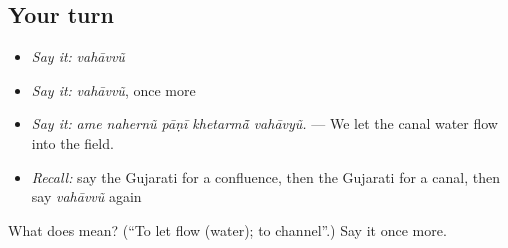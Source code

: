 \subsection*{Your turn}
\begin{itemize}
\raggedright
  \item \emph{Say it:} \emph{vahāvvũ}
  \item \emph{Say it:} \emph{vahāvvũ}, once more
  \item \emph{Say it:} \emph{ame nahernũ pāṇī khetarmā̃ vahāvyũ.} — We let the canal water flow into the field.
  \item \emph{Recall:} say the Gujarati for a confluence, then the Gujarati for a canal, then say \emph{vahāvvũ} again
\end{itemize}

\begin{tcolorbox}[breakable,colback=teal!4,colframe=teal!35!black,title={Before you move on}]
What does  mean? (\textquotedblleft{}To let flow (water); to channel\textquotedblright{}.) Say it once more.
\end{tcolorbox}
